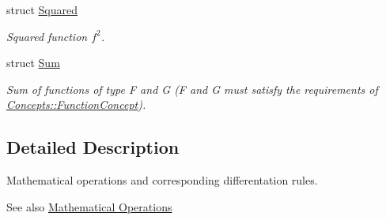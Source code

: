 \begin{DoxyCompactItemize}
struct \hyperlink{structFunG_1_1MathematicalOperations_1_1Squared}{\-Squared}
\begin{DoxyCompactList}\small\item\em \-Squared function $f^2$. \end{DoxyCompactList}\item 
struct \hyperlink{structFunG_1_1MathematicalOperations_1_1Sum}{\-Sum}
\begin{DoxyCompactList}\small\item\em \-Sum of functions of type \-F and \-G (\-F and \-G must satisfy the requirements of \hyperlink{structFunG_1_1Concepts_1_1FunctionConcept}{\-Concepts\-::\-Function\-Concept}). \end{DoxyCompactList}\end{DoxyCompactItemize}


\subsection{\-Detailed \-Description}
\-Mathematical operations and corresponding differentation rules. \begin{DoxySeeAlso}{\-See also}
\hyperlink{group__MathematicalOperationsGroup}{\-Mathematical Operations} 
\end{DoxySeeAlso}
